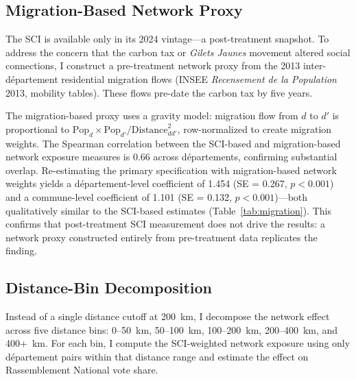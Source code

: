 \documentclass[12pt]{article}
\newcommand{\rn}{Rassemblement National}
\newcommand{\gj}{\textit{Gilets Jaunes}}
\newcommand{\dept}{d\'{e}partement}
\newcommand{\depts}{d\'{e}partements}
\begin{document}
\subsection{Migration-Based Network Proxy}

The SCI is available only in its 2024 vintage---a post-treatment snapshot. To address the concern that the carbon tax or \gj{} movement altered social connections, I construct a pre-treatment network proxy from the 2013 inter-\dept{} residential migration flows (INSEE \textit{Recensement de la Population} 2013, mobility tables). These flows pre-date the carbon tax by five years.

The migration-based proxy uses a gravity model: migration flow from $d$ to $d'$ is proportional to $\text{Pop}_d \times \text{Pop}_{d'} / \text{Distance}_{dd'}^2$, row-normalized to create migration weights. The Spearman correlation between the SCI-based and migration-based network exposure measures is 0.66 across \depts{}, confirming substantial overlap. Re-estimating the primary specification with migration-based network weights yields a \dept{}-level coefficient of 1.454 (SE = 0.267, $p < 0.001$) and a commune-level coefficient of 1.101 (SE = 0.132, $p < 0.001$)---both qualitatively similar to the SCI-based estimates (Table~\ref{tab:migration}). This confirms that post-treatment SCI measurement does not drive the results: a network proxy constructed entirely from pre-treatment data replicates the finding.

\subsection{Distance-Bin Decomposition}

Instead of a single distance cutoff at 200~km, I decompose the network effect across five distance bins: 0--50~km, 50--100~km, 100--200~km, 200--400~km, and 400+~km. For each bin, I compute the SCI-weighted network exposure using only \dept{} pairs within that distance range and estimate the effect on \rn{} vote share.
\end{document}
